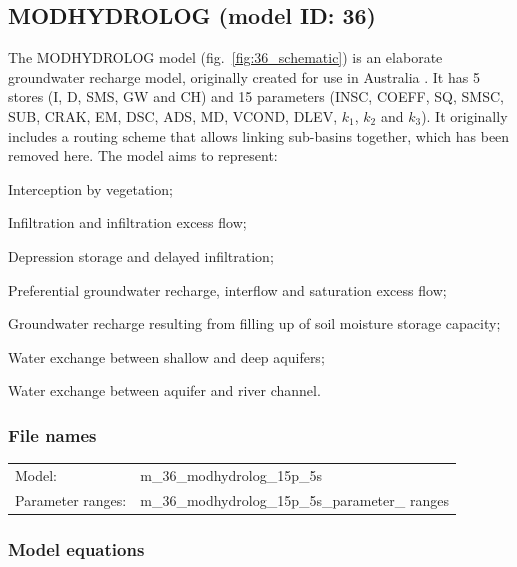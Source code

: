 \subsection{MODHYDROLOG (model ID: 36)}
The MODHYDROLOG model (fig.~\ref{fig:36_schematic}) is an elaborate groundwater recharge model, originally created for use in Australia \citep{Chiew1990,Chiew1994}. It has 5 stores (I, D, SMS, GW and CH) and 15 parameters (INSC, COEFF, SQ, SMSC, SUB, CRAK, EM, DSC, ADS, MD, VCOND, DLEV, $k_1$, $k_2$ and $k_3$). It originally includes a routing scheme that allows linking sub-basins together, which has been removed here. The model aims to represent:

\begin{itemizecompact}
\item Interception by vegetation;
\item Infiltration and infiltration excess flow;
\item Depression storage and delayed infiltration;
\item Preferential groundwater recharge, interflow and saturation excess flow;
\item Groundwater recharge resulting from filling up of soil moisture storage capacity;
\item Water exchange between shallow and deep aquifers;
\item Water exchange between aquifer and river channel.
\end{itemizecompact}

\subsubsection{File names}
\begin{tabular}{@{}ll}
Model: &m\_36\_modhydrolog\_15p\_5s \\
Parameter ranges: &m\_36\_modhydrolog\_15p\_5s\_parameter\_ ranges \\
\end{tabular}

\subsubsection{Model equations}

